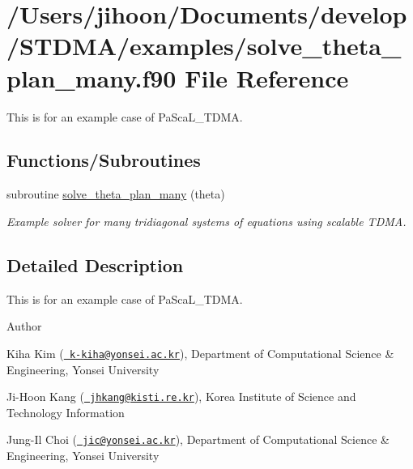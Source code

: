 \hypertarget{solve__theta__plan__many_8f90}{}\section{/\+Users/jihoon/\+Documents/develop/\+S\+T\+D\+M\+A/examples/solve\+\_\+theta\+\_\+plan\+\_\+many.f90 File Reference}
\label{solve__theta__plan__many_8f90}


This is for an example case of Pa\+Sca\+L\+\_\+\+T\+D\+MA.  


\subsection*{Functions/\+Subroutines}
\begin{DoxyCompactItemize}
\item 
subroutine \mbox{\hyperlink{solve__theta__plan__many_8f90_af048018fcdfbe66e00922dee3e7e9a64}{solve\+\_\+theta\+\_\+plan\+\_\+many}} (theta)
\begin{DoxyCompactList}\small\item\em Example solver for many tridiagonal systems of equations using scalable T\+D\+MA. \end{DoxyCompactList}\end{DoxyCompactItemize}


\subsection{Detailed Description}
This is for an example case of Pa\+Sca\+L\+\_\+\+T\+D\+MA. 

\begin{DoxyAuthor}{Author}

\end{DoxyAuthor}

\begin{DoxyItemize}
\item Kiha Kim (\href{mailto:k-kiha@yonsei.ac.kr}{\texttt{ k-\/kiha@yonsei.\+ac.\+kr}}), Department of Computational Science \& Engineering, Yonsei University
\item Ji-\/\+Hoon Kang (\href{mailto:jhkang@kisti.re.kr}{\texttt{ jhkang@kisti.\+re.\+kr}}), Korea Institute of Science and Technology Information
\item Jung-\/\+Il Choi (\href{mailto:jic@yonsei.ac.kr}{\texttt{ jic@yonsei.\+ac.\+kr}}), Department of Computational Science \& Engineering, Yonsei University
\end{DoxyItemize}

